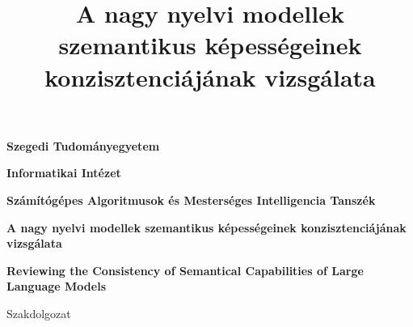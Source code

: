 \documentclass[12pt]{report}
\title{
     A nagy nyelvi modellek szemantikus képességeinek konzisztenciájának vizsgálata
}
\theoremstyle{definition}
\begin{document}

\pagestyle{fancy}
\fancyhf{}
\fancyfoot[R]{\thepage}

\thispagestyle{empty}

\begin{center}
	\vspace*{1cm}
	\begin{Large}
		\bf Szegedi Tudományegyetem
	\end{Large}

	\vspace{0.5cm}

	\begin{Large}
		\bf Informatikai Intézet
	\end{Large}

	\begin{Large}
		\bf Számítógépes Algoritmusok és Mesterséges Intelligencia Tanszék
	\end{Large}



	\vspace*{3cm}


	{\LARGE\bf \begin{Large}
		\bf
		A nagy nyelvi modellek szemantikus képességeinek konzisztenciájának vizsgálata
		\end{Large}}


	\vspace*{0.5cm}


	{\LARGE\bf \begin{Large}
		\bf
		Reviewing the Consistency of Semantical Capabilities of Large Language Models
		\end{Large}}

	\vspace*{2.4cm}


	{\Large Szakdolgozat}




\end{center}
\end{document}
